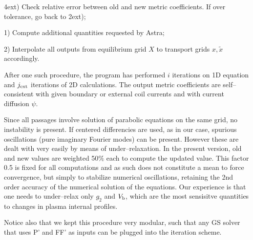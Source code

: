 4ext) Check relative error between old and new metric coefficients. If over tolerance, go back to 2ext);

1) Compute additional quantities requested by Astra;

2) Interpolate all outputs from equilibrium grid $X$ to transport grids $x,\tilde{x}$ accordingly.

After one such procedure, the program has performed $i$ iterations on 1D equation and $j_{\rm ext}$ 
iterations of 2D calculations. The output metric coefficients are self--consistent with given boundary or 
external coil currents and with current diffusion $\psi$.

Since all passages involve solution of parabolic equations on the same grid, no instability is present. If 
centered differencies are used, as in our case, spurious oscillations (pure imaginary Fourier modes) can be
present. However these are dealt with very easily by means of under--relaxation. In the present version,
old and new values are weighted 50$\%$ each to compute the updated value. This factor 0.5 is fixed for all 
computations and as such does not constitute a mean to force convergence, but simply to stabilize numerical
oscillations, retaining the 2nd order accuracy of the numerical solution of the equations. Our experience 
is that one needs to under--relax only $g_2$ and $V_{\rm b}$, which are the most sensisitve quantities to 
changes in plasma internal profiles.

Notice also that we kept this procedure very modular, such that any GS solver that uses P' and FF' as
inputs can be plugged into the iteration scheme.
%

